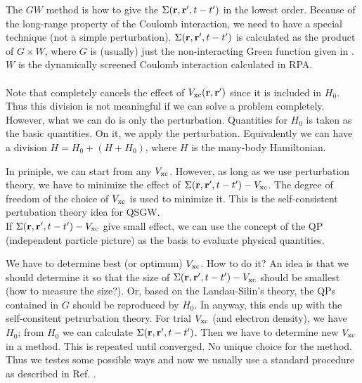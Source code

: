 The $GW$ method is how to give the $\Sigma({\bf r},{\bf r}',t-t')$ in the lowest order.
Because of the long-range property of the Coulomb interaction, we need
to have a special technique (not a simple perturbation). 
$\Sigma({\bf r},{\bf r}',t-t')$ is calculated as the product of $G \times W$, where $G$
is (usually) just the non-interacting Green function given in .
$W$ is the dynamically screened Coulomb interaction calculated in RPA.\\

\\
Note that  completely cancels the effect of 
$V_{\rm xc}({\bf r},{\bf r}')$ since it is included in $H_0$.
Thus this division is not meaningful if we can solve a problem completely.
However, what we can do is only the perturbation.
Quantities for $H_0$ is taken as the basic quantities. On it, we apply the perturbation.
Equivalently we can have a division $H=H_0+(H+H_0)$, where $H$ is the
many-body Hamiltonian. 

In priniple, we can start from any $V_{\rm xc}$. However,
as long as we use perturbation theory, we have to minimize 
the effect of $\Sigma({\bf r},{\bf r}',t-t')-V_{\rm xc}$.
The degree of freedom of the choice of $V_{\rm xc}$ is used 
to minimize it. This is the self-consistent pertubation theory idea for QSGW.\\

If $\Sigma({\bf r},{\bf r}',t-t')-V_{\rm xc}$ 
give small effect, we can use the concept of the QP
(independent particle picture) as the basis to evaluate physical
quantities.

We have to determine best (or optimum) $V_{\rm xc}$. How to do it?
An idea is that we should determine it so that 
the size of $\Sigma({\bf r},{\bf r}',t-t')-V_{\rm xc}$ should be smallest 
(how to measure the size?).
Or, based on the Landau-Silin's theory, 
the QPs contained in $G$ should be reproduced by $H_0$.
In anyway, this ends up with the self-consitent petrurbation theory.
For trial $V_{\rm xc}$ (and electron density), we have $H_0$; from $H_0$
we can calculate $\Sigma({\bf r},{\bf r}',t-t')$. Then we have to
determine new $V_{\rm xc}$ in a method. This is repeated until converged.
No unique choice for the method. Thus we testes some possible ways
and now we usually use a standard procedure as described in Ref.
 \cite{kotani_quasiparticle_2014}.


\newpage
